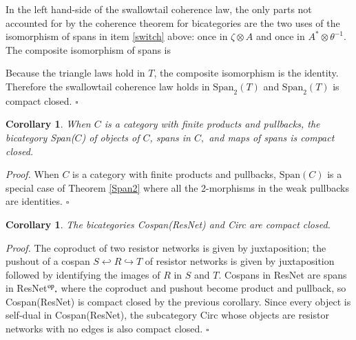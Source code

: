 \documentclass{article}
\newcommand{\tensor}{\otimes}
\newcommand{\op}{{\rm op}}
\newcommand{\Span}{\mbox{Span}}
\newtheorem{cor}[thm]{Corollary}
\begin{document}
In the left hand-side of the swallowtail coherence law, the only parts not accounted for by the coherence theorem for bicategories are the two uses of the isomorphism of spans in item \ref{switch} above: once in $\zeta\tensor A$ and once in $A^*\tensor \theta^{-1}$.  The composite isomorphism of spans is
\begin{center}
\end{center}
Because the triangle laws hold in $T$, the composite isomorphism is the identity.  Therefore the swallowtail coherence law holds in $\Span_2(T)$ and $\Span_2(T)$ is compact closed. \hfill $\square$

\begin{cor}
  \label{span}
  When $C$ is a category with finite products and pullbacks, the bicategory Span($C$) of objects of $C$, spans in $C,$ and maps of spans is compact closed.
\end{cor}
{\em Proof.} When $C$ is a category with finite products and pullbacks,
$\Span(C)$ is a special case of Theorem \ref{Span2} where all the
2-morphisms in the weak pullbacks are identities. \hfill $\square$

\begin{cor}
  The bicategories Cospan(ResNet) and Circ are compact closed.
\end{cor}
{\em Proof.} The coproduct of two resistor networks is given by juxtaposition; the pushout of a cospan $S \hookleftarrow R
\hookrightarrow T$ of resistor networks is given by juxtaposition followed by identifying the images of $R$ in $S$ and $T$.  Cospans in ResNet are spans in ResNet${}^{\op},$ where the coproduct and pushout become product and pullback, so Cospan(ResNet) is compact closed by the previous corollary.  Since every object is self-dual in Cospan(ResNet), the subcategory Circ whose objects are resistor networks with no edges is also compact closed. \hfill $\square$
\end{document}
